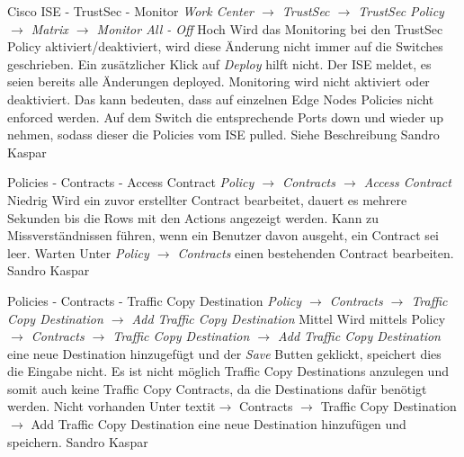 \bugreport
{Cisco ISE - TrustSec - Monitor}
{\textit{Work Center $\rightarrow$ TrustSec $\rightarrow$ TrustSec Policy $\rightarrow$ Matrix $\rightarrow$ Monitor All - Off}}
{Hoch}
{Wird das Monitoring bei den TrustSec Policy aktiviert/deaktiviert, wird diese Änderung nicht immer auf die Switches geschrieben. Ein zusätzlicher Klick auf \textit{Deploy} hilft nicht. Der ISE meldet, es seien bereits alle Änderungen deployed.}
{Monitoring wird nicht aktiviert oder deaktiviert. Das kann bedeuten, dass auf einzelnen Edge Nodes Policies nicht enforced werden.}
{Auf dem Switch die entsprechende Ports down und wieder up nehmen, sodass dieser die Policies vom ISE pulled.}
{
	Siehe Beschreibung
}
{Sandro Kaspar}
{}


\bugreport
{Policies - Contracts - Access Contract}
{\textit{Policy $\rightarrow$ Contracts $\rightarrow$ Access Contract}}
{Niedrig}
{Wird ein zuvor erstellter Contract bearbeitet, dauert es mehrere Sekunden bis die Rows mit den Actions angezeigt werden.}
{Kann zu Missverständnissen führen, wenn ein Benutzer davon ausgeht, ein Contract sei leer.}
{Warten}
{Unter \textit{Policy $\rightarrow$ Contracts} einen bestehenden Contract bearbeiten.}
{Sandro Kaspar}
{}
	

\bugreport
{Policies - Contracts - Traffic Copy Destination}
{\textit{Policy $\rightarrow$ Contracts $\rightarrow$ Traffic Copy Destination $\rightarrow$ Add Traffic Copy Destination}}
{Mittel}
{Wird mittels Policy \textit{$\rightarrow$ Contracts $\rightarrow$ Traffic Copy Destination $\rightarrow$ Add Traffic Copy Destination} eine neue Destination hinzugefügt und der \textit{Save} Butten geklickt, speichert dies die Eingabe nicht.}
{Es ist nicht möglich Traffic Copy Destinations anzulegen und somit auch keine Traffic Copy Contracts, da die Destinations dafür benötigt werden.}
{Nicht vorhanden}
{Unter textit{$\rightarrow$ Contracts $\rightarrow$ Traffic Copy Destination $\rightarrow$ Add Traffic Copy Destination} eine neue Destination hinzufügen und speichern.}
{Sandro Kaspar}
{}







